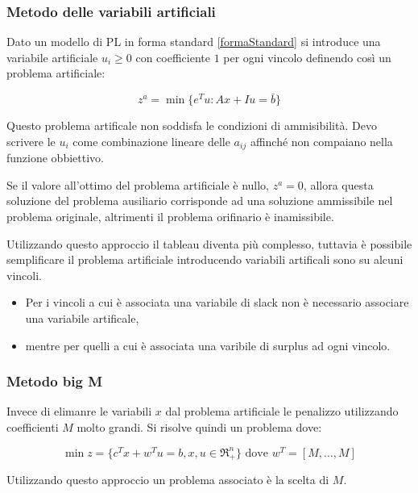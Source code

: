 \subsubsection{Metodo delle variabili artificiali}
Dato un modello di PL in forma standard \ref{formaStandard} si introduce una variabile artificiale $u_i\geq0$ con coefficiente $1$ per ogni vincolo definendo così un problema artificiale:

\begin{equation} \label{problemaArtificiale}
z^{a} = \min \{ e^{T}u : Ax+Iu=\bar{b} \}
\end{equation}

Questo problema artificale non soddisfa le condizioni di ammisibilità. Devo scrivere le $u_i$ come combinazione lineare delle $a_{ij}$ affinché non compaiano nella funzione obbiettivo.

Se il valore all'ottimo del problema artificiale è nullo, $z^a=0$, allora questa soluzione del problema ausiliario corrisponde ad una soluzione ammissibile nel problema originale, altrimenti il problema orifinario è inamissibile.

Utilizzando questo approccio il tableau diventa più complesso, tuttavia è possibile semplificare il problema artificiale introducendo variabili artificali sono su alcuni vincoli.

\begin{itemize}
	\item Per i vincoli a cui è associata una variabile di slack non è necessario associare una variabile artificale, %
	\item mentre per quelli a cui è associata una varibile di surplus ad ogni vincolo. %
\end{itemize}

\subsubsection{Metodo big M}
Invece di elimanre le variabili $x$ dal problema artificiale le penalizzo utilizzando coefficienti $M$ molto grandi.
Si risolve quindi un problema dove:

\begin{equation} \label{MetodoBigM}
\min z = \{ c^{T}x+w^{T}u=b , x,u \in \Re^{n}_+ \} \text{	dove } w^{T} = [M, \dotsc, M] 
\end{equation}

Utilizzando questo approccio un problema associato è la scelta di $M$.

